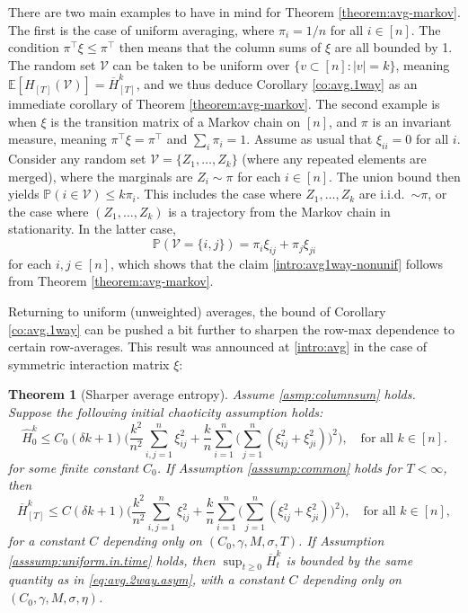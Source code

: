 \documentclass[11pt,reqno]{amsart}
\numberwithin{equation}{section}
\newtheorem{theorem}{Theorem}[section]
\theoremstyle{definition}
\def\E{{\mathbb E}}
\def\PP{{\mathbb P}}
\def\V{{\mathcal V}}
\begin{document}
There are two main examples to have in mind for Theorem \ref{theorem:avg-markov}. The first is the case of uniform averaging, where $\pi_i=1/n$ for all $i \in [n]$. The condition $\pi^\top \xi \le \pi^\top$ then means that the column sums of $\xi$ are all bounded by 1. The random set $\V$ can be taken to be uniform over $\{v \subset [n] : |v|=k\}$, meaning $\E[H_{[T]}(\V)]=\overline{H}^k_{[T]}$, and we thus deduce Corollary \ref{co:avg.1way} as an immediate corollary of Theorem \ref{theorem:avg-markov}.
The second example is when $\xi$ is the transition matrix of a Markov chain on $[n]$, and $\pi$ is an invariant measure, meaning $\pi^\top \xi = \pi^\top$ and $\sum_i\pi_i=1$. Assume as usual that $\xi_{ii}=0$ for all $i$. Consider any random set $\V=\{Z_1,\ldots,Z_k\}$ (where any repeated elements are merged), where the marginals are $Z_i \sim \pi$ for each $i \in [n]$. The union bound then yields $\PP(i \in \V) \le k\pi_i$. 
This includes the case where $Z_1,\ldots,Z_k$ are i.i.d.\ $\sim \pi$, or the case where $(Z_1,\ldots,Z_k)$ is a trajectory from the Markov chain in stationarity. In the latter case,
\begin{equation*}
\PP(\V=\{i,j\}) = \pi_i\xi_{ij} + \pi_j\xi_{ji}
\end{equation*}
for each $i,j \in [n]$, which shows that the claim \eqref{intro:avg1way-nonunif} follows from Theorem \ref{theorem:avg-markov}.


Returning to uniform (unweighted) averages, the bound of Corollary \ref{co:avg.1way} can be pushed a bit further to sharpen the row-max dependence to certain row-averages. This result was announced at \eqref{intro:avg} in the case of symmetric interaction matrix $\xi$:

\begin{theorem} [Sharper average entropy] \label{theorem:avg.2way.asym}
Assume \eqref{asmp:columnsum} holds. 
Suppose the following initial chaoticity assumption holds: 
	\begin{equation}  \label{eq: init.chao.assum}
		\widehat{H}_0^k \leq C_0  (\delta k + 1)\bigg(\frac{ k^2}{n^2}\sum_{i,j=1}^n\xi_{ij}^2 + \frac{ k}{n}\sum_{i=1}^n\bigg(\sum_{j=1}^n (\xi_{ij}^2 +\xi_{ji}^2)\bigg)^2\bigg) , \quad \text{for all } k \in [n].
	\end{equation}
	for some finite constant $C_0$.
	If Assumption \ref{asssump:common} holds for $T < \infty$, then 
	\begin{equation} \label{eq:avg.2way.asym}
	\overline{H}^{k}_{[T]} \le C 
	 (\delta k + 1)\bigg(\frac{ k^2}{n^2}\sum_{i,j=1}^n\xi_{ij}^2 + \frac{ k}{n} \sum_{i=1}^n\bigg(\sum_{j=1}^n (\xi_{ij}^2 +\xi_{ji}^2)\bigg)^2\bigg), \quad \text{for all } k \in [n],
	\end{equation}
	for a constant  $C$ depending only on $(C_0, \gamma, M,\sigma, T)$. 
If Assumption \ref{asssump:uniform.in.time} holds, then $\sup_{t \ge 0}\overline{H}^{k}_t$ is bounded by the same quantity as in \eqref{eq:avg.2way.asym}, with a constant  $C$ depending only on $(C_0, \gamma, M,\sigma, \eta)$. 
\end{theorem}
\end{document}
